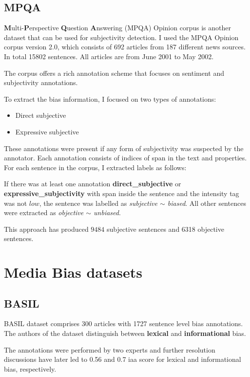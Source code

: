 \subsection{MPQA}
\textbf{M}ulti-\textbf{P}erspective \textbf{Q}uestion \textbf{A}nswering (MPQA) Opinion corpus is another dataset that can be used for subjectivity detection. I used the MPQA Opinion corpus version 2.0, which consists of 692 articles from 187 different news sources. In total 15802 sentences. All articles are from June 2001 to May 2002.

The corpus offers a rich annotation scheme \cite{wiebe2005annotating} that focuses on sentiment and subjectivity annotations.

To extract the bias information, I focused on two types of annotations:
\begin{itemize}
    \item Direct subjective
    \item Expressive subjective
\end{itemize}
These annotations were present if any form of subjectivity was suspected by the annotator. Each annotation consists of indices of span in the text and properties. For each sentence in the corpus, I extracted labels as follows:

If there was at least one annotation \textbf{direct\_subjective} or \textbf{expressive\_subjectivity} with span inside the sentence and the intensity tag was not $low$, the sentence was labelled as \textit{subjective $\sim$ biased}. All other sentences were extracted as \textit{objective $\sim$ unbiased}.

This approach has produced $9484$ subjective sentences and 6318 objective sentences.


\section{Media Bias datasets}


\subsection{BASIL}
BASIL dataset \cite{fan2019plain} comprises 300 articles with 1727 sentence level bias annotations. The authors of the dataset distinguish between \textbf{lexical} and \textbf{informational} bias.

The annotations were performed by two experts and further resolution discussions have later led to 0.56 and 0.7 \Gls{iaa} score for lexical and informational bias, respectively.

